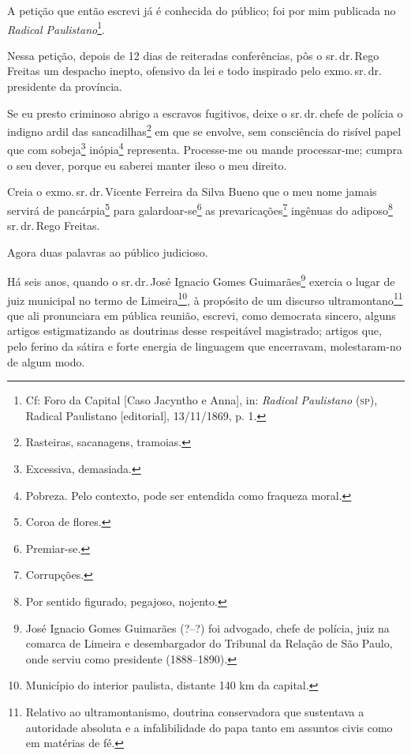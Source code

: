 A petição que então escrevi já é conhecida do público; foi por mim
publicada no \emph{Radical Paulistano}\footnote{Cf: Foro da Capital
  {[}Caso Jacyntho e Anna{]}, in: \emph{Radical Paulistano} (\textsc{sp}),
  Radical Paulistano {[}editorial{]}, 13/11/1869, p. 1.}.

Nessa petição, depois de 12 dias de reiteradas conferências, pôs o sr.\,dr.\,Rego Freitas um despacho inepto, ofensivo da lei e todo inspirado
pelo exmo.\,sr.\,dr.\,presidente da província.

Se eu presto criminoso abrigo a escravos fugitivos, deixe o sr.\,dr.\,chefe de polícia o indigno ardil das sancadilhas\footnote{Rasteiras,
  sacanagens, tramoias.} em que se envolve, sem consciência do risível
papel que com sobeja\footnote{Excessiva, demasiada.} inópia\footnote{
  Pobreza. Pelo contexto, pode ser entendida como fraqueza moral.}
representa. Processe-me ou mande processar-me; cumpra o seu dever,
porque eu saberei manter ileso o meu direito.

Creia o exmo.\,sr.\,dr.\,Vicente Ferreira da Silva Bueno que o meu nome
jamais servirá de pancárpia\footnote{Coroa de flores.} para
galardoar-se\footnote{Premiar-se.} as prevaricações\footnote{
  Corrupções.} ingênuas do adiposo\footnote{Por sentido figurado,
  pegajoso, nojento.} sr.\,dr.\,Rego Freitas.

Agora duas palavras ao público judicioso.

Há seis anos, quando o sr.\,dr.\,José Ignacio Gomes Guimarães\footnote{
  José Ignacio Gomes Guimarães (?--?) foi advogado, chefe de polícia,
  juiz na comarca de Limeira e desembargador do Tribunal da Relação de
  São Paulo, onde serviu como presidente (1888--1890).} exercia o lugar
de juiz municipal no termo de Limeira\footnote{Município do interior
  paulista, distante 140 km da capital.}, à propósito de um discurso
ultramontano\footnote{Relativo ao ultramontanismo, doutrina
  conservadora que sustentava a autoridade absoluta e a infalibilidade
  do papa tanto em assuntos civis como em matérias de fé.} que ali
pronunciara em pública reunião, escrevi, como democrata sincero, alguns
artigos estigmatizando as doutrinas desse respeitável magistrado;
artigos que, pelo ferino da sátira e forte energia de linguagem que
encerravam, molestaram-no de algum modo.

